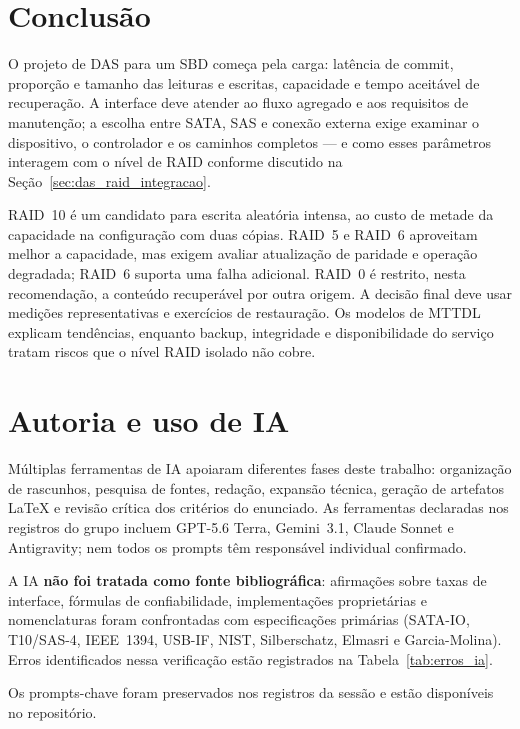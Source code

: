 \documentclass[titlepage]{article}
\begin{document}
\section{Conclusão}
\label{sec:conclusao}
O projeto de DAS para um SBD começa pela carga: latência de commit, proporção e tamanho das leituras e escritas, capacidade e tempo aceitável de recuperação. A interface deve atender ao fluxo agregado e aos requisitos de manutenção; a escolha entre SATA, SAS e conexão externa exige examinar o dispositivo, o controlador e os caminhos completos --- e como esses parâmetros interagem com o nível de RAID conforme discutido na Seção~\ref{sec:das_raid_integracao}.

RAID~10 é um candidato para escrita aleatória intensa, ao custo de metade da capacidade na configuração com duas cópias. RAID~5 e RAID~6 aproveitam melhor a capacidade, mas exigem avaliar atualização de paridade e operação degradada; RAID~6 suporta uma falha adicional. RAID~0 é restrito, nesta recomendação, a conteúdo recuperável por outra origem. A decisão final deve usar medições representativas e exercícios de restauração. Os modelos de MTTDL explicam tendências, enquanto backup, integridade e disponibilidade do serviço tratam riscos que o nível RAID isolado não cobre.

\section{Autoria e uso de IA}
Múltiplas ferramentas de IA apoiaram diferentes fases deste trabalho: organização de rascunhos, pesquisa de fontes, redação, expansão técnica, geração de artefatos \LaTeX{} e revisão crítica dos critérios do enunciado. As ferramentas declaradas nos registros do grupo incluem GPT-5.6 Terra, Gemini~3.1, Claude Sonnet e Antigravity; nem todos os prompts têm responsável individual confirmado.

A IA \textbf{não foi tratada como fonte bibliográfica}: afirmações sobre taxas de interface, fórmulas de confiabilidade, implementações proprietárias e nomenclaturas foram confrontadas com especificações primárias (SATA-IO, T10/SAS-4, IEEE~1394, USB-IF, NIST, Silberschatz, Elmasri e Garcia-Molina). Erros identificados nessa verificação estão registrados na Tabela~\ref{tab:erros_ia}.

Os prompts-chave foram preservados nos registros da sessão e estão disponíveis no repositório.
\end{document}
